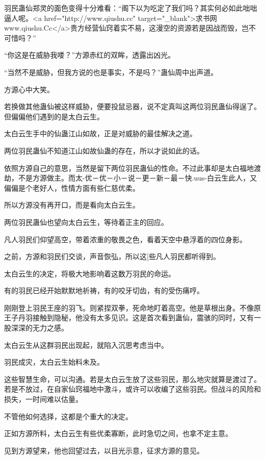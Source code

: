 
\begin{this_body}

羽民蛊仙郑灵的面色变得十分难看：“阁下以为吃定了我们吗？其实何必如此咄咄逼人呢。<a href="http://www.qiushu.cc" target="\_blank">求书网www.qiushu.Cc</a>贵方经营仙窍着实不易，这漫空的资源若是因战而毁，岂不可惜吗？”

“你这是在威胁我喽？”方源赤红的双眸，透露出凶光。

“当然不是威胁，但我方说的也是事实，不是吗？”蛊仙周中出声道。

方源心中大笑。

若换做其他蛊仙被这样威胁，便要投鼠忌器，说不定真叫这两位羽民蛊仙得逞了。但偏偏他们遇到的是太白云生。

太白云生手中的仙蛊江山如故，正是对威胁的最佳解决之道。

两位羽民蛊仙不知道江山如故仙蛊的存在，所以才说如此的话。

依照方源自己的意思，当然是留下两位羽民蛊仙的性命。不过此事却是太白福地渡劫，不是方源做主。而太-优－优－小－说－更－新－最－快.uus-白云生此人，又偏偏是个老好人，性情方面有些仁慈优柔。

所以方源没有再开口，而是看向太白云生。

两位羽民蛊仙也望向太白云生，等待着正主的回应。

凡人羽民们仰望高空，带着浓重的敬畏之色，看着天空中悬浮着的四位身影。

之前，方源和羽民们交谈，声音恢弘，所以这[些凡人羽民都听得到。

太白云生的决定，将极大地影响着这数万羽民的命运。

有的羽民已经开始默默地祈祷，有的咬牙切齿，有的受伤痛哼。

刚刚登上羽民王座的羽飞。则紧捏双拳，死命地盯着高空。他是草根出身。不像原王子丹羽接触到隐秘，他没有太多见识。这是首次看到蛊仙，震骇的同时，又有一股深深的无力之感。

太白云生从这群羽民出现起，就陷入沉思考虑当中。

羽民成灾，太白云生始料未及。

这些智慧生命，可以沟通。若是太白云生放了这些羽民，那么地灾就算是渡过了。若是不放过，在自家仙窍福地中激斗，或许可以收编了这些羽民。但战斗的风险和损失，一时间难以估量。

不管他如何选择，这都是个重大的决定。

正如方源所料，太白云生有些优柔寡断，此时急切之间，也拿不定主意。

见到方源望来，他也回望过去，以目光示意，征求方源的意见。


\end{this_body}
